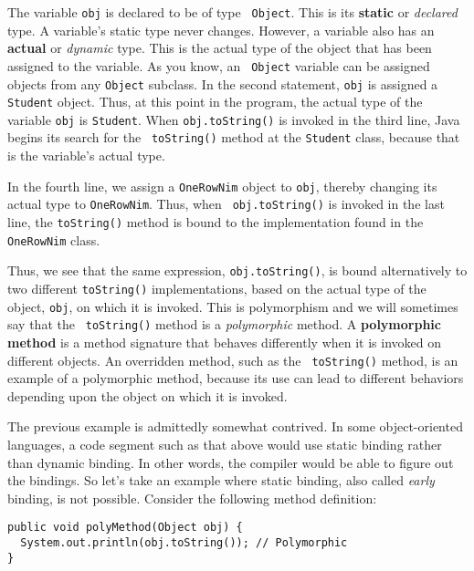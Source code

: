 \noindent The variable {\tt obj} is declared to be of type {\tt
Object}.  This is its {\bf static} or {\em declared} type.  A
variable's static type never changes.  However, a variable also has an
{\bf actual} or {\em dynamic} type.  This is the actual type of the
object that has been assigned to the variable.  As you know, an {\tt
Object} variable can be assigned objects from any {\tt Object}
subclass.  In the second statement, {\tt obj} is assigned a {\tt
Student} object.  Thus, at this point in the program, the actual type
of the variable {\tt obj} is {\tt Student}.  When {\tt obj.toString()}
is invoked in the third line, Java begins its search for the {\tt
toString()} method at the {\tt Student} class, because that is the
variable's actual type.

In the fourth line, we assign a {\tt OneRowNim} object to {\tt obj},
thereby changing its actual type to {\tt OneRowNim}.  Thus, when {\tt
obj.toString()} is invoked in the last line, the {\tt toString()}
method is bound to the implementation found in the {\tt OneRowNim}
class.

Thus, we see that the same expression, {\tt obj.toString()}, is bound
alternatively to two different {\tt toString()} implementations, based
on the actual type of the object, {\tt obj}, on which it is invoked.
This is polymorphism and we will sometimes say that the {\tt
{}
toString()} method is a {\em polymorphic} method. A {\bf polymorphic
method} is a method signature that behaves differently when it is
invoked on different objects.  An overridden method, such as the {\tt
toString()} method, is an example of a polymorphic method,
because its use can lead to different behaviors depending upon the
object on which it is invoked.

The previous example is admittedly somewhat contrived. In some
object-oriented languages, a code segment such as that above would use
static binding rather than dynamic binding. In other words, the
compiler would be able to figure out the bindings.  So let's take an
example where static binding, also called {\em early} binding, is not
possible. Consider the following method definition:

\begin{jjjlisting}
\begin{lstlisting}
public void polyMethod(Object obj) {
  System.out.println(obj.toString()); // Polymorphic
}
\end{lstlisting}
\end{jjjlisting}

